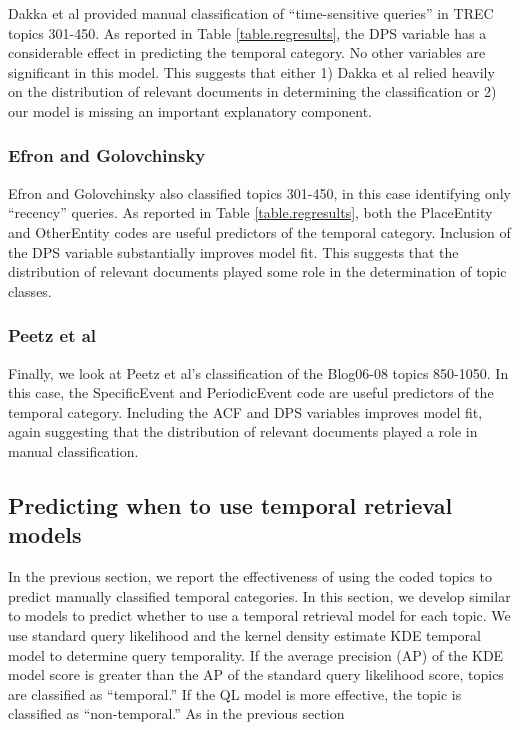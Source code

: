 \documentclass{sig-alternate}
\begin{document}
Dakka et al provided manual classification of ``time-sensitive queries'' in TREC topics 301-450. As reported in Table \ref{table.regresults}, the DPS variable has a considerable effect in predicting the temporal category. No other variables are significant in this model. This suggests that either 1) Dakka et al relied heavily on the distribution of relevant documents in determining the classification or 2) our model is missing an important explanatory component.

\subsubsection{Efron and Golovchinsky}

Efron and Golovchinsky also classified topics 301-450, in this case identifying only ``recency'' queries. As reported in Table \ref{table.regresults}, both the PlaceEntity and OtherEntity codes are useful predictors of the temporal category. Inclusion of the DPS variable substantially improves model fit. This suggests that the distribution of relevant documents played some role in the determination of topic classes.

\subsubsection{Peetz et al}
Finally, we look at Peetz et al's classification of the Blog06-08 topics 850-1050. In this case, the SpecificEvent and PeriodicEvent code are useful predictors of the temporal category. Including the ACF and DPS variables improves model fit, again suggesting that the distribution of relevant documents played a role in manual classification.

\subsection{Predicting when to use temporal retrieval models}

In the previous section, we report the effectiveness of using the coded topics to predict manually classified temporal categories. In this section, we develop similar to models to predict whether to use a temporal retrieval model for each topic. We use standard query likelihood \cite{XXX} and the kernel density estimate {KDE} temporal model \cite{Efron2014} to determine query temporality. If the average precision (AP) of the KDE model score is greater than the AP of the standard query likelihood score, topics are classified as ``temporal.''  If the QL model is more effective, the topic is classified as ``non-temporal.'' As in the previous section
\end{document}
